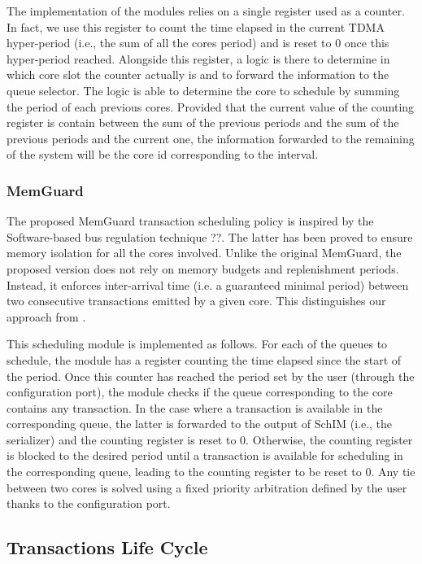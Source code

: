 The implementation of the modules relies on a single register used as
a counter. In fact, we use this register to count the time elapsed in
the current TDMA hyper-period (i.e., the sum of all the cores period)
and is reset to 0 once this hyper-period reached. Alongside this
register, a logic is there to determine in which core slot the counter
actually is and to forward the information to the queue selector. The
logic is able to determine the core to schedule by summing the period
of each previous cores. Provided that the current value of the
counting register is contain between the sum of the previous periods
and the sum of the previous periods and the current one, the
information forwarded to the remaining of the system will be the core
id corresponding to the interval.  

\subsubsection{MemGuard}
The proposed MemGuard transaction scheduling policy is inspired by the
Software-based bus regulation technique ??. The latter has been proved
to ensure memory isolation for all the cores involved. Unlike the
original MemGuard, the proposed version does not rely on memory
budgets and replenishment periods. Instead, it enforces inter-arrival
time (i.e. a guaranteed minimal period) between two consecutive
transactions emitted by a given core. This distinguishes our approach
from \cite{Farshchi2020BRUBR}.

This scheduling module is implemented as follows. For each of the
queues to schedule, the module has a register counting the time
elapsed since the start of the period. Once this counter has reached
the period set by the user (through the configuration port), the
module checks if the queue corresponding to the core contains any
transaction. In the case where a transaction is available in the
corresponding queue, the latter is forwarded to the output of SchIM
(i.e., the serializer) and the counting register is reset to
0. Otherwise, the counting register is blocked to the desired period
until a transaction is available for scheduling in the corresponding
queue, leading to the counting register to be reset to 0. Any tie
between two cores is solved using a fixed priority arbitration defined
by the user thanks to the configuration port.


\subsection{Transactions Life Cycle}
\label{subsec:transaction-life-cycle}

